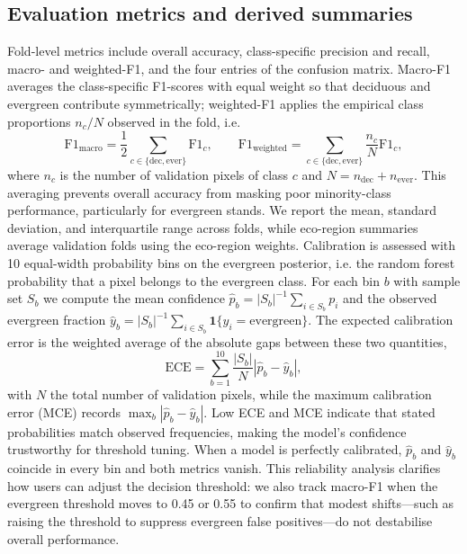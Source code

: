 \documentclass[utf8]{FrontiersinHarvard}
\begin{document}
\subsection{Evaluation metrics and derived summaries}
\label{sec:metrics}
Fold-level metrics include overall accuracy, class-specific precision and recall, macro- and weighted-F1, and the four entries of the confusion matrix. Macro-F1 averages the class-specific F1-scores with equal weight so that deciduous and evergreen contribute symmetrically; weighted-F1 applies the empirical class proportions \(n_c/N\) observed in the fold, i.e.
\begin{equation*}
    \mathrm{F1}_{\text{macro}} = \frac{1}{2} \sum_{c \in \{\text{dec}, \text{ever}\}} \mathrm{F1}_c,
    \qquad
    \mathrm{F1}_{\text{weighted}} = \sum_{c \in \{\text{dec}, \text{ever}\}} \frac{n_c}{N} \mathrm{F1}_c,
\end{equation*}
where \(n_c\) is the number of validation pixels of class \(c\) and \(N = n_{\text{dec}} + n_{\text{ever}}\). This averaging prevents overall accuracy from masking poor minority-class performance, particularly for evergreen stands. We report the mean, standard deviation, and interquartile range across folds, while eco-region summaries average validation folds using the eco-region weights. Calibration is assessed with 10 equal-width probability bins on the evergreen posterior, i.e. the random forest probability that a pixel belongs to the evergreen class. For each bin \(b\) with sample set \(S_b\) we compute the mean confidence \(\hat{p}_b = |S_b|^{-1} \sum_{i \in S_b} p_i\) and the observed evergreen fraction \(\hat{y}_b = |S_b|^{-1} \sum_{i \in S_b} \mathbf{1}\{y_i = \text{evergreen}\}\). The expected calibration error is the weighted average of the absolute gaps between these two quantities,
\begin{equation*}
    \mathrm{ECE} = \sum_{b=1}^{10} \frac{|S_b|}{N} \left| \hat{p}_b - \hat{y}_b \right|,
\end{equation*}
with \(N\) the total number of validation pixels, while the maximum calibration error (MCE) records \(\max_b \left| \hat{p}_b - \hat{y}_b \right|\). Low ECE and MCE indicate that stated probabilities match observed frequencies, making the model's confidence trustworthy for threshold tuning. When a model is perfectly calibrated, \(\hat{p}_b\) and \(\hat{y}_b\) coincide in every bin and both metrics vanish. This reliability analysis clarifies how users can adjust the decision threshold: we also track macro-F1 when the evergreen threshold moves to 0.45 or 0.55 to confirm that modest shifts—such as raising the threshold to suppress evergreen false positives—do not destabilise overall performance.
\end{document}
